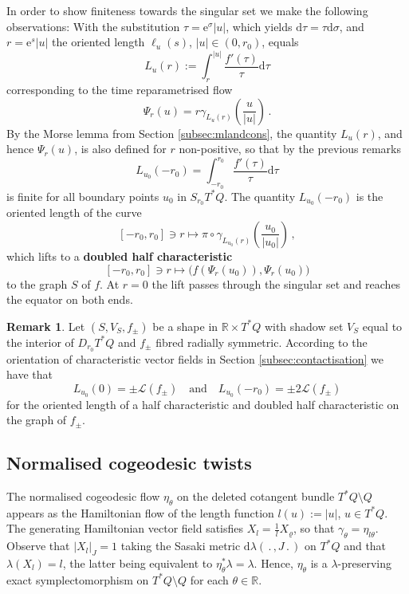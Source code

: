 \documentclass{amsart}
\theoremstyle{definition}
\newtheorem{rem}[prop]{Remark}
\newcommand{\rmd}{\mathrm d}
\newcommand{\rme}{\mathrm e}
\newcommand{\LLL}{\mathscr L}
\newcommand{\R}{\mathbb R}
\begin{document}
In order to show finiteness towards the singular set
we make the following observations:
With the substitution $\tau=\rme^{\sigma}|u|$,
which yields $\rmd\tau=\tau\rmd\sigma$,
and $r=\rme^s|u|$ the oriented length $\ell_u(s)$, $|u|\in(0,r_0)$, equals
\[
L_u(r):=
\int_r^{|u|}
          \frac{f'(\tau)}{\tau}
\rmd\tau
\]
corresponding to the time reparametrised flow
\[
\Psi_r(u)=r\gamma_{L_u(r)}
\left(\frac{u}{|u|}\right)
\,.
\]
By the Morse lemma from Section \ref{subsec:mlandcons},
the quantity $L_u(r)$, and hence $\Psi_r(u)$,
is also defined for $r$ non-positive,
so that by the previous remarks
\[
L_{u_0}(-r_0)=
\int_{-r_0}^{r_0}
          \frac{f'(\tau)}{\tau}
\rmd\tau
\]
is finite for all boundary points $u_0$ in $S_{r_0}T^*Q$.
The quantity $L_{u_0}(-r_0)$ is the oriented length
of the curve
\[
[-r_0,r_0]\ni r\longmapsto\pi\circ\gamma_{L_{u_0}(r)}
\left(\frac{u_0}{|u_0|}\right)
\,,
\]
which lifts to a {\bf doubled half characteristic}
\[
[-r_0,r_0]\ni r\longmapsto
\big(f(\Psi_r(u_0)),\Psi_r(u_0)\big)
\]
to the graph $S$ of $f$.
At $r=0$ the lift passes through the singular set
and reaches the equator on both ends.


\begin{rem}
Let $(S,V_S,f_{\pm})$ be a shape in $\R\times T^*Q$
with shadow set $V_S$
equal to the interior of $D_{r_0}T^*Q$
and $f_{\pm}$ fibred radially symmetric.
According to the orientation
of characteristic vector fields
in Section \ref{subsec:contactisation}
we have that
\[
L_{u_0}(0)=\pm\LLL(f_{\pm})
\quad\text{and}\quad
L_{u_0}(-r_0)=\pm2\LLL(f_{\pm})
\]
for the oriented length of
a half characteristic and
doubled half characteristic
on the graph of $f_{\pm}$.
\end{rem}



\subsection{Normalised cogeodesic twists\label{subsec:normcogeotwists}}

  The normalised cogeodesic flow $\eta_{\theta}$
  on the deleted cotangent bundle
  $T^*Q\setminus Q$ appears
  as the Hamiltonian flow
  of the length function $l(u):=|u|$, $u\in T^*Q$.
  The generating Hamiltonian vector field satisfies
  $X_l=\frac{1}{l}X_{\varrho}$, so that
  $\gamma_{\theta}=\eta_{l\theta}$.
  Observe that $|X_l|_J=1$ taking the Sasaki metric
  $\rmd\lambda(\,.\,,J\,.\,)$ on $T^*Q$  
  and that $\lambda(X_l)=l$,
  the latter being equivalent to
  $\eta_{\theta}^*\lambda=\lambda$.
  Hence, $\eta_{\theta}$ is a $\lambda$-preserving
  exact symplectomorphism
  on $T^*Q\setminus Q$ for each $\theta\in\R$.
  
\end{document}
